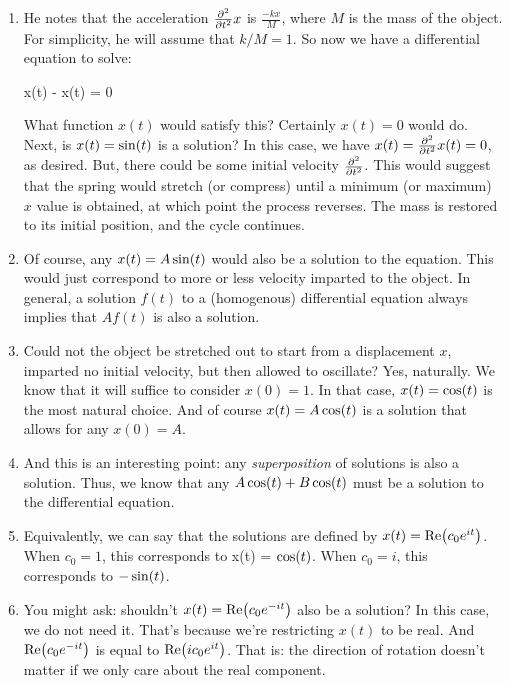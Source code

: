 \begin{enumerate}
  \item He notes that the acceleration $\frac{\partial^2 }{\partial {t}^2} x$ is
  $\frac{-kx}{M}$, where $M$ is the mass of the object. For simplicity,
  he will assume that $k/M=1$. So now we have a differential equation to
  solve:

  \begin{nedqn}
    x(t) -  x(t) = 0
  \end{nedqn}

  \noindent
  What function $x(t)$ would satisfy this? Certainly $x(t) = 0$ would
  do. Next, is $x(t) = \sin\mathopen{}\left( {t} \right)\mathclose{}$ is a solution? In this case, we have
  $x(t) = \frac{\partial^2 }{\partial {t}^2} x(t) = 0$, as desired. But, there could be some
  initial velocity $\frac{\partial^2 }{\partial {t}^2}$. This would suggest that the spring
  would stretch (or compress) until a minimum (or maximum) $x$ value is
  obtained, at which point the process reverses. The mass is restored to
  its initial position, and the cycle continues.

  \item Of course, any $x(t) = A \sin\mathopen{}\left( {t} \right)\mathclose{}$ would also be a solution to
  the equation. This would just correspond to more or less velocity
  imparted to the object. In general, a solution $f(t)$ to a
  (homogenous) differential equation always implies that $Af(t)$ is also
  a solution.

  \item Could not the object be stretched out to start from a
  displacement $x$, imparted no initial velocity, but then allowed to
  oscillate? Yes, naturally. We know that it will suffice to consider
  $x(0) = 1$. In that case, $x(t) = \cos\mathopen{}\left( {t} \right)\mathclose{}$ is the most natural
  choice. And of course $x(t) = A \cos\mathopen{}\left( {t} \right)\mathclose{}$ is a solution that allows
  for any $x(0) = A$.

  \item And this is an interesting point: any \emph{superposition} of
  solutions is also a solution. Thus, we know that any $A\cos\mathopen{}\left( {t} \right)\mathclose{} +
  B\cos\mathopen{}\left( {t} \right)\mathclose{}$ must be a solution to the differential equation.

  \item Equivalently, we can say that the solutions are defined by $x(t)
  = \text{Re}\mathopen{}\left( {c_0 e^{it}} \right)\mathclose{}$. When $c_0 = 1$, this corresponds to
  x(t) = $\cos\mathopen{}\left( {t} \right)\mathclose{}$. When $c_0 = i$, this corresponds to $-\sin\mathopen{}\left( {t} \right)\mathclose{}$.

  \item You might ask: shouldn't $x(t) = \text{Re}\mathopen{}\left( {c_0 e^{-it}} \right)\mathclose{}$
  also be a solution? In this case, we do not need it. That's because
  we're restricting $x(t)$ to be real. And $\text{Re}\mathopen{}\left( {c_0
  e^{-it}} \right)\mathclose{}$ is equal to $\text{Re}\mathopen{}\left( {ic_0 e^{it}} \right)\mathclose{}$. That is: the
  direction of rotation doesn't matter if we only care about the real
  component.
\end{enumerate}

